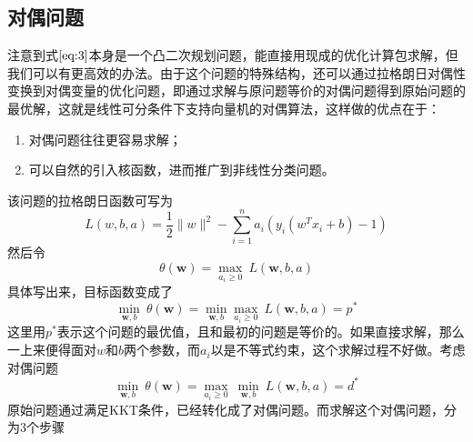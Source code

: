 \subsection*{对偶问题}
注意到式$\ref{eq:3}$本身是一个凸二次规划问题，能直接用现成的优化计算包求解，但我们可以有更高效的办法。由于这个问题的特殊结构，还可以通过拉格朗日对偶性变换到对偶变量的优化问题，即通过求解与原问题等价的对偶问题得到原始问题的最优解，这就是线性可分条件下支持向量机的对偶算法，这样做的优点在于：
\begin{enumerate}
	\item 对偶问题往往更容易求解；
	\item 可以自然的引入核函数，进而推广到非线性分类问题。	
\end{enumerate}
该问题的拉格朗日函数可写为
\begin{equation}
L(w,b,a) = \frac{1}{2}\lVert w \rVert^2 - \sum_{i=1}^na_i (y_i(w^T x_i + b) - 1)
\end{equation}
然后令
\begin{equation}
\theta (\boldsymbol{w}) = \mathop{\mathrm{max}} \limits_{a_i \geq 0}\ L(\boldsymbol{w},b,a)
\end{equation}
具体写出来，目标函数变成了
\begin{equation}
\mathop{\mathrm{min}}\limits_{\boldsymbol{w},b}\ \theta(\boldsymbol{w}) = \mathop{\mathrm{min}}\limits_{\boldsymbol{w},b}\mathop{ max}\limits_{a_i \geq 0}\ L(\boldsymbol{w},b,a) = p^*
\end{equation}
这里用$p^*$表示这个问题的最优值，且和最初的问题是等价的。如果直接求解，那么一上来便得面对$w$和$b$两个参数，而$a_i$以是不等式约束，这个求解过程不好做。考虑对偶问题
\begin{equation}
\mathop{\mathrm{min}}\limits_{\boldsymbol{w},b}\ \theta(\boldsymbol{w}) = \mathop{ \mathrm{max}}\limits_{a_i \geq 0}\ \mathop{\mathrm{min}}\limits_{\boldsymbol{w},b}\ L(\boldsymbol{w},b,a) = d^*
\end{equation}
原始问题通过满足KKT条件，已经转化成了对偶问题。而求解这个对偶问题，分为3个步骤
